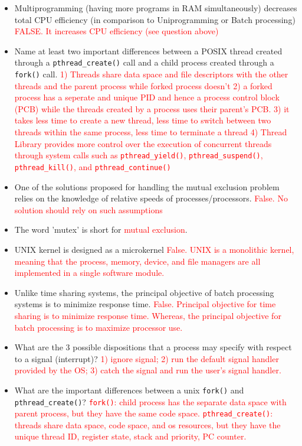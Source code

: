 \documentclass[10pt,landscape]{article}
\newcommand{\answer}[1]{\textcolor{red}{#1}}
\begin{document}
\begin{multicols}{4}
\begin{itemize}
    \item Multiprogramming (having more programs in RAM simultaneously) decreases total CPU efficiency (in comparison to Uniprogramming or Batch processing)  \answer{FALSE. It increases CPU efficiency (see question above)}
    \item Name at least two important differences between a POSIX thread created through a \verb$pthread_create()$ call and a child process created through a \verb$fork()$ call.  \answer{1) Threads share data space and file descriptors with the other threads and the parent process while forked process doesn't 2) a forked process has a seperate and unique PID and hence a process control block (PCB) while the threads created by a process uses their parent's PCB.  3) it takes less time to create a new thread, less time to switch between two threads within the same process, less time to terminate a thread 4) Thread Library provides more control over the execution of concurrent threads through system calls such as \texttt{pthread\_yield()}, \texttt{pthread\_suspend()}, \texttt{pthread\_kill()}, and \texttt{pthread\_continue()}}
    \item One of the solutions proposed for handling the mutual exclusion problem relies on the knowledge of relative speeds of processes/processors. \answer{False. No solution should rely on such assumptions}
    \item The word 'mutex' is short for \answer{mutual exclusion}.
    \item UNIX kernel is designed as a microkernel \answer{False. UNIX is a monolithic kernel, meaning that the process, memory, device, and file managers are all implemented in a single software module.}
    \item Unlike time sharing systems, the principal objective of batch processing systems is to minimize response time. \answer{False. Principal objective for time sharing is to minimize response time. Whereas, the principal objective for batch processing is to maximize processor use.}
    \item What are the 3 possible dispositions that a process may specify with respect to a signal (interrupt)? \answer{1) ignore signal; 2) run the default signal handler provided by the OS; 3) catch the signal and run the user's signal handler.}
    \item What are the important differences between a unix \verb$fork()$ and \verb$pthread_create()$?  \answer{\texttt{fork()}: child process has the separate data space with parent process, but they have the same code space.  \texttt{pthread\_create()}: threads share data space, code space, and os resources, but they have the unique thread ID, register state, stack and priority, PC counter.}

\end{itemize}
\end{multicols}
\end{document}
